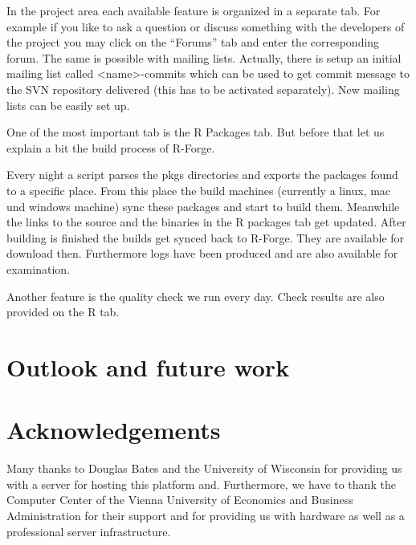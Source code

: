 In the project area each available feature is organized in a separate
tab. For example if you like to ask a question or discuss something
with the developers of the project you may click on the ``Forums'' tab
and enter the corresponding forum. The same is possible with mailing
lists. Actually, there is setup an initial mailing list called
<name>-commits which can be used to get commit message to the SVN
repository delivered (this has to be activated separately). New
mailing lists can be easily set up.

One of the most important tab is the R Packages tab. But before that
let us explain a bit the build process of R-Forge.

Every night a script parses the pkgs directories and exports the
packages found to a specific place. From this place the build machines
(currently a linux, mac und windows machine) sync these packages and
start to build them. Meanwhile the links to the source and the
binaries in the R packages tab get updated. After building is finished
the builds get synced back to R-Forge. They are available for download
then. Furthermore logs have been produced and are also available for
examination.

Another feature is the quality check we run every day. Check results
are also provided on the R tab.




\section*{Outlook and future work}


\section{Acknowledgements}

Many thanks to Douglas Bates and the University of Wisconsin
for providing us with a server for hosting this platform
and. Furthermore, we have to thank the Computer Center 
of the Vienna University of Economics and Business Administration for
their support and for providing us with hardware as well as a
professional server infrastructure.

